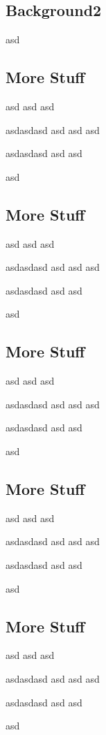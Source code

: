 \documentclass[bib]{statapress}
\begin{document}
\subsection{Background2}\label{background2}

asd

\subsection{More Stuff}\label{more-stuff}

asd asd asd

asdasdasd asd asd asd

asdasdasd asd asd

asd

\subsection{More Stuff}\label{more-stuff-1}

asd asd asd

asdasdasd asd asd asd

asdasdasd asd asd

asd

\subsection{More Stuff}\label{more-stuff-2}

asd asd asd

asdasdasd asd asd asd

asdasdasd asd asd

asd

\subsection{More Stuff}\label{more-stuff-3}

asd asd asd

asdasdasd asd asd asd

asdasdasd asd asd

asd

\subsection{More Stuff}\label{more-stuff-4}

asd asd asd

asdasdasd asd asd asd

asdasdasd asd asd

asd
\end{document}

